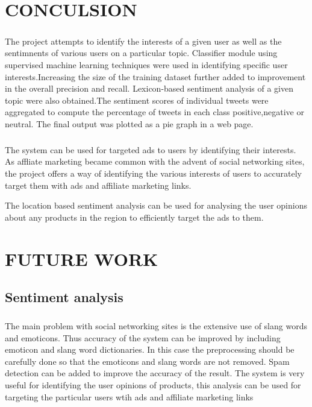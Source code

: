 \chapter{CONCULSION}

\paragraph{}
The project attempts to identify the interests of a given user as well as the sentimnents of various users on a particular topic. Classifier module using supervised machine learning techniques were used in identifying specific user interests.Increasing the size of the training dataset further added to improvement in the overall precision and recall. Lexicon-based sentiment analysis of a given topic were also  obtained.The sentiment scores of individual tweets were aggregated to compute the percentage of tweets in each class positive,negative or neutral. The final output was plotted as a pie graph in a web page. 

\paragraph{}
The system can be used for targeted ads to users by identifying their interests. As affliate marketing became common with the advent of social networking sites, the project offers a way of identifying the various interests of users to accurately target them with ads and affiliate marketing links.

The location based sentiment analysis can be used for analysing the user opinions about any products in the region to efficiently target the ads to them.
 
\chapter{FUTURE WORK}
\section{Sentiment analysis}
	\paragraph{} The main problem with social networking sites is the extensive use of slang words and emoticons. Thus accuracy of the system can be improved by including emoticon and slang word dictionaries. In this case the preprocessing should be carefully done so that the emoticons and slang words are not removed. Spam detection can be added to improve the accuracy of the result. The system is very useful for identifying the user opinions of products, this analysis can be used for targeting the particular users wtih ads and affiliate marketing links
	
